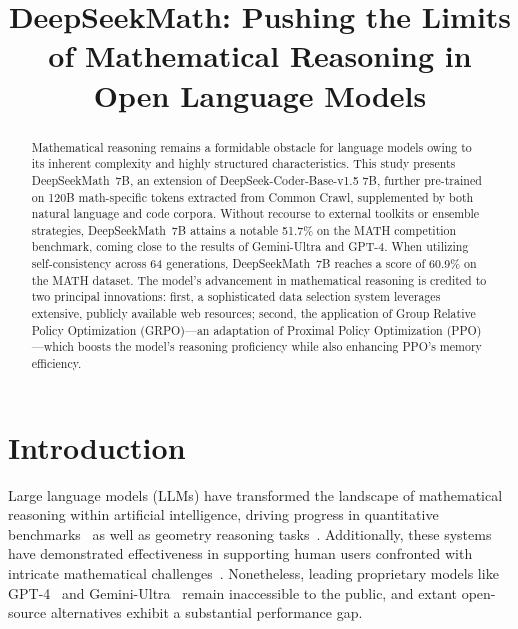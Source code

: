 \title{DeepSeekMath: Pushing the Limits of Mathematical Reasoning in Open Language Models}

\begin{abstract}
Mathematical reasoning remains a formidable obstacle for language models owing to its inherent complexity and highly structured characteristics. This study presents DeepSeekMath~7B, an extension of DeepSeek-Coder-Base-v1.5 7B, further pre-trained on 120B math-specific tokens extracted from Common Crawl, supplemented by both natural language and code corpora. Without recourse to external toolkits or ensemble strategies, DeepSeekMath~7B attains a notable 51.7\% on the MATH competition benchmark, coming close to the results of Gemini-Ultra and GPT-4. When utilizing self-consistency across 64 generations, DeepSeekMath~7B reaches a score of 60.9\% on the MATH dataset. The model’s advancement in mathematical reasoning is credited to two principal innovations: first, a sophisticated data selection system leverages extensive, publicly available web resources; second, the application of Group Relative Policy Optimization (GRPO)—an adaptation of Proximal Policy Optimization (PPO)—which boosts the model's reasoning proficiency while also enhancing PPO's memory efficiency.
\end{abstract}

\section{Introduction}

Large language models (LLMs) have transformed the landscape of mathematical reasoning within artificial intelligence, driving progress in quantitative benchmarks~\citep{MATH} as well as geometry reasoning tasks~\citep{trinh2024solving}. Additionally, these systems have demonstrated effectiveness in supporting human users confronted with intricate mathematical challenges~\citep{tao}. Nonetheless, leading proprietary models like GPT-4~\citep{gpt4} and Gemini-Ultra~\citep{gemini} remain inaccessible to the public, and extant open-source alternatives exhibit a substantial performance gap.

